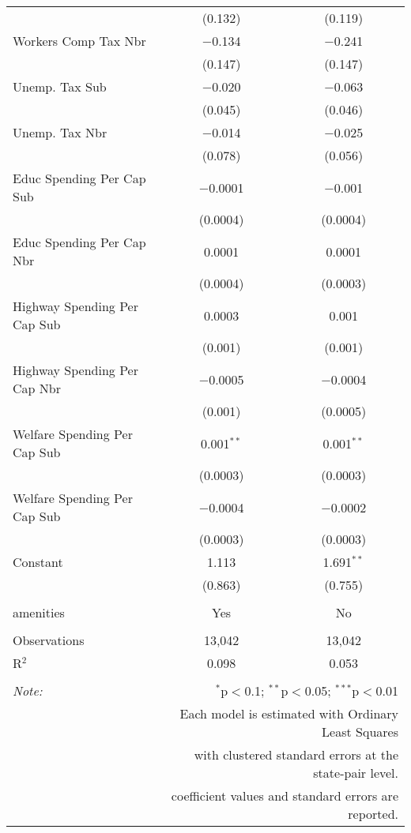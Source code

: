 \begin{table}[!htbp]
\begin{tabular}{@{\extracolsep{5pt}}lcc}
  & (0.132) & (0.119) \\ 
  Workers Comp Tax Nbr & $-$0.134 & $-$0.241 \\ 
  & (0.147) & (0.147) \\ 
  Unemp. Tax Sub & $-$0.020 & $-$0.063 \\ 
  & (0.045) & (0.046) \\ 
  Unemp. Tax Nbr & $-$0.014 & $-$0.025 \\ 
  & (0.078) & (0.056) \\ 
  Educ Spending Per Cap Sub & $-$0.0001 & $-$0.001 \\ 
  & (0.0004) & (0.0004) \\ 
  Educ Spending Per Cap Nbr & 0.0001 & 0.0001 \\ 
  & (0.0004) & (0.0003) \\ 
  Highway Spending Per Cap Sub & 0.0003 & 0.001 \\ 
  & (0.001) & (0.001) \\ 
  Highway Spending Per Cap Nbr & $-$0.0005 & $-$0.0004 \\ 
  & (0.001) & (0.0005) \\ 
  Welfare Spending Per Cap Sub & 0.001$^{**}$ & 0.001$^{**}$ \\ 
  & (0.0003) & (0.0003) \\ 
  Welfare Spending Per Cap Sub & $-$0.0004 & $-$0.0002 \\ 
  & (0.0003) & (0.0003) \\ 
  Constant & 1.113 & 1.691$^{**}$ \\ 
  & (0.863) & (0.755) \\ 
 \hline \\[-1.8ex] 
amenities & Yes & No \\ 
\hline \\[-1.8ex] 
Observations & 13,042 & 13,042 \\ 
R$^{2}$ & 0.098 & 0.053 \\ 
\hline 
\hline \\[-1.8ex] 
\textit{Note:}  & \multicolumn{2}{r}{$^{*}$p$<$0.1; $^{**}$p$<$0.05; $^{***}$p$<$0.01} \\ 
 & \multicolumn{2}{r}{Each model is estimated with Ordinary Least Squares} \\ 
 & \multicolumn{2}{r}{with clustered standard errors at the state-pair level.} \\ 
 & \multicolumn{2}{r}{coefficient values and standard errors are reported.} \\ 
\end{tabular} 
\end{table} 
